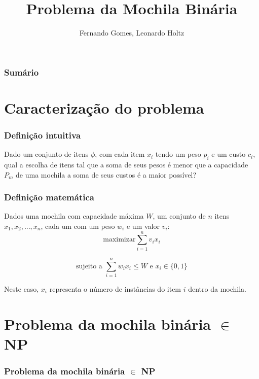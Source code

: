 \documentclass{beamer}
\title{Problema da Mochila Binária}
\author{Fernando Gomes, Leonardo Holtz}
\institute{Universidade Federal do Rio Grande do Sul}
\date{}
\begin{document}
\begin{frame}
\titlepage
\end{frame}

\begin{frame}
\frametitle{Sumário}
\tableofcontents
\end{frame}

\section{Caracterização do problema}

\begin{frame}
\frametitle{Definição intuitiva}

    Dado um conjunto de itens $\phi$, com cada item $x_{i}$ tendo um peso $p_{i}$
    e um custo $c_{i}$, qual a escolha de itens tal que a soma de seus pesos é menor
    que a capacidade $P_{m}$ de uma mochila a soma de seus custos é a maior possível?

\end{frame}

\begin{frame}
\frametitle{Definição matemática}

    Dados uma mochila com capacidade máxima $W$, um conjunto de $n$ itens $x_{1}, x_{2}, ..., x_{n}$,
    cada um com um peso $w_{i}$ e um valor $v_{i}$:\\

    \begin{equation*}
        \text{maximizar} \sum_{i=1}^{n} v_{i} x_{i}
    \end{equation*}

    \begin{equation*}
        \mbox{sujeito a } \sum_{i=1}^{n} w_{i} x_{i} \leq W \mbox{ e } x_{i} \in \{0,1\}
    \end{equation*}

    Neste caso, $x_{i}$ representa o número de instâncias do item $i$ dentro da mochila.

\end{frame}


\section{Problema da mochila binária $\in$ NP}
\begin{frame}
\frametitle{Problema da mochila binária $\in$ NP}
\end{frame}
\end{document}
